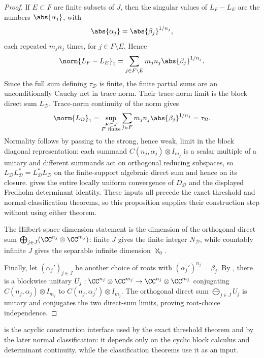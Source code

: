 \begin{proof}
  If \(E\subset F\) are finite subsets of \(J\), then the singular values
  of \(L_F-L_E\) are the numbers
  \(\abs{\alpha_j}\), with
  \[
    \abs{\alpha_j}=\abs{\beta_j}^{1/n_j},
  \]
  each repeated \(m_jn_j\) times, for \(j\in F\setminus E\). Hence
  \[
    \norm{L_F-L_E}_1
    =\sum_{j\in F\setminus E}m_jn_j\abs{\beta_j}^{1/n_j}.
  \]
  Since the full sum defining \(\tau_{\mathcal D}\) is finite, the finite
  partial sums are an unconditionally Cauchy net in trace norm. Their
  trace-norm limit is the block direct sum
  \(L_{\mathcal D}\). Trace-norm continuity of the norm gives
  \[
    \norm{L_{\mathcal D}}_1
    =\sup_{\substack{F\subset J\\ F\ \mathrm{finite}}}
      \sum_{j\in F}m_jn_j\abs{\beta_j}^{1/n_j}
    =\tau_{\mathcal D}.
  \]
  Normality follows by passing to the strong, hence weak, limit in the
  block diagonal representation: each summand
  \(C(n_j,\alpha_j)\otimes I_{m_j}\) is a scalar multiple of a unitary and
  different summands act on orthogonal reducing subspaces, so
  \(L_{\mathcal D}L_{\mathcal D}^*=L_{\mathcal D}^*L_{\mathcal D}\) on the
  finite-support algebraic direct sum and hence on its closure.
  gives the entire locally uniform convergence of \(D_{\mathcal D}\) and
  the displayed Fredholm determinant identity. These inputs all precede
  the exact threshold and normal-classification theorems, so this
  proposition supplies their construction step without using either
  theorem.

  The Hilbert-space dimension statement is the dimension of the orthogonal
  direct sum
  \(\bigoplus_{j\in J}(\CC^{n_j}\otimes\CC^{m_j})\): finite \(J\) gives the
  finite integer \(N_{\mathcal D}\), while countably infinite \(J\) gives
  the separable infinite dimension \(\aleph_0\).

  Finally, let \((\alpha_j')_{j\in J}\) be another choice of roots with
  \((\alpha_j')^{n_j}=\beta_j\). By , there is a
  blockwise unitary
  \(U_j:\CC^{n_j}\otimes\CC^{m_j}\to\CC^{n_j}\otimes\CC^{m_j}\) conjugating
  \(C(n_j,\alpha_j)\otimes I_{m_j}\) to
  \(C(n_j,\alpha_j')\otimes I_{m_j}\). The orthogonal direct sum
  \(\bigoplus_{j\in J}U_j\) is unitary and conjugates the two direct-sum
  limits, proving root-choice independence.
\end{proof}

\noindent
{} is the acyclic
construction interface used by the exact threshold theorem and by the
later normal classification: it depends only on the cyclic block
calculus and determinant continuity, while the classification theorems
use it as an input.


